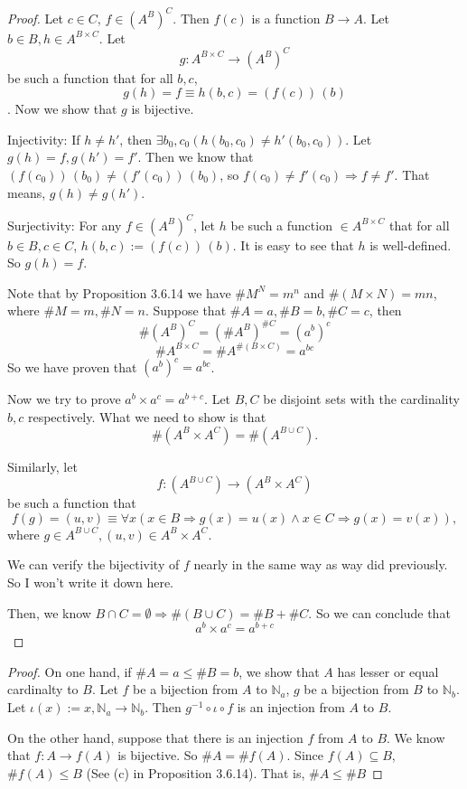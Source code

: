 \begin{proof}
Let $c \in C$, $f \in (A^B)^C$. Then $f(c)$ is a function $B\rightarrow A$. Let 
$b \in B, h \in A^{B\times C}$. Let
\[
g:A^{B\times C} \rightarrow (A^B)^{C}
\]
be such a function that for all $b,c$,
\[
g(h) = f \equiv h(b,c) = (f(c))\,(b)
\]
. Now we show that $g$ is bijective.

Injectivity: 
If $h \neq h'$, then $\exists b_0,c_0(h(b_0,c_0) \neq h'(b_0,c_0))$. Let $g(h) =f, g(h') = f'$. Then we 
know that $(f(c_0))\,(b_0) \neq (f'(c_0))\,(b_0)$, so $f(c_0) \neq f'(c_0) \Longrightarrow f \neq f'$. 
That means, $g(h) \neq g(h')$.

Surjectivity:
For any $f \in (A^B)^{C}$, let $h$ be such a function $\in A^{B\times C}$ that for all $b \in B,c \in C$, 
$h(b,c) := (f(c))\,(b)$. It is easy to see that $h$ is well-defined. So $g(h) = f$.

Note that by Proposition 3.6.14 we have $\#M^N = m^n$ and $\#(M \times N) = mn$, where $\#M =m, \#N =n$. 
Suppose that $\#A = a, \#B = b, \#C = c$, then
\[
\#(A^B)^C = (\#A^B)^{\#C} = (a^b)^c
\]
\[
\#A^{B\times C} = \#A^{\#(B \times C)} = a^{bc}
\]
So we have proven that $(a^b)^c = a^{bc}$.

Now we try to prove $a^b \times a^c = a^{b+c}$. Let $B,C$ be disjoint sets with the cardinality $b,c$ 
respectively. What we need to show is that
\[
\#(A^B \times A^C) = \#(A^{B \cup C}).
\]

Similarly, let 
\[
f: (A^{B \cup C}) \rightarrow (A^B \times A^C)
\]
be such a function that 
\[
f(g) = (u,v) \equiv \forall x(x \in B \Rightarrow g(x) = u(x) \wedge x \in C \Rightarrow g(x) = v(x)),
\]
where $g\in A^{B \cup C}, (u,v) \in A^B \times A^C$.

We can verify the bijectivity of $f$ nearly in the same way as way did previously. So I won't write it 
down here.

Then, we know $B \cap C = \emptyset \Rightarrow \#(B \cup C) = \#B + \#C$. So we can conclude that 
\[
a^b \times a^c = a^{b+c}
\]
\end{proof}

\begin{proof}
On one hand, if $\#A = a \leq \#B = b$, we show that $A$ has lesser or equal cardinalty to $B$. Let $f$ 
be a bijection from $A$ to $\mathbb{N}_{a}$, $g$ be a bijection from $B$ to $\mathbb{N}_b$. Let 
$\iota(x):=x, \mathbb{N}_{a} \rightarrow \mathbb{N}_b$. Then $g^{-1} \circ \iota \circ f$ is an injection 
from $A$ to $B$.

On the other hand, suppose that there is an injection $f$ from $A$ to $B$. We know that 
$f:A\rightarrow f(A)$ is bijective. So $\#A = \#f(A)$. Since $f(A) \subseteq B$, $\#f(A) \leq B$ (See (c) 
in Proposition 3.6.14). That is, $\#A \leq \#B$
\end{proof}

